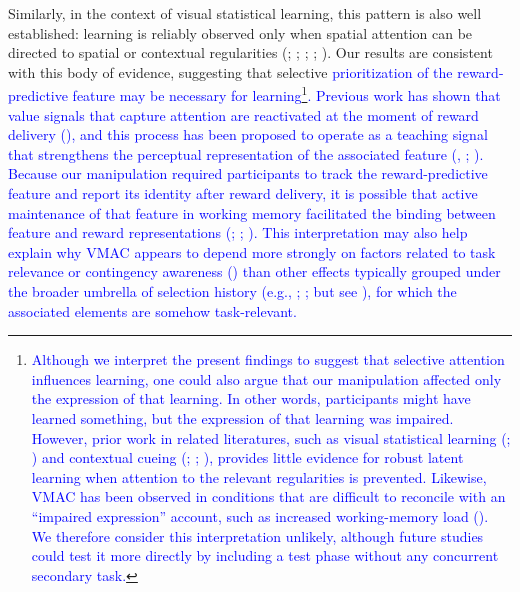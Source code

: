 \documentclass[
  man,
  floatsintext,
  longtable,
  nolmodern,
  notxfonts,
  notimes,
  mask,
  colorlinks=true,linkcolor=blue,citecolor=blue,urlcolor=blue]{apa7}
\begin{document}
Similarly, in the context of visual statistical learning, this pattern
is also well established: learning is reliably observed only when
spatial attention can be directed to spatial or contextual regularities
(;
;
;
;
). Our results are
consistent with this body of evidence, suggesting that selective
\textcolor{blue}{prioritization of the reward-predictive feature may be
necessary for learning\footnote{\textcolor{blue}{Although we interpret
  the present findings to suggest that selective attention influences
  learning, one could also argue that our manipulation affected only the
  expression of that learning. In other words, participants might have
  learned something, but the expression of that learning was impaired.
  However, prior work in related literatures, such as visual statistical
  learning (;
  ) and contextual cueing
  (;
  ;
  ), provides little
  evidence for robust latent learning when attention to the relevant
  regularities is prevented. Likewise, VMAC has been observed in
  conditions that are difficult to reconcile with an ``impaired
  expression'' account, such as increased working-memory load
  (). We
  therefore consider this interpretation unlikely, although future
  studies could test it more directly by including a test phase without
  any concurrent secondary task.}}. Previous work has shown that value
signals that capture attention are reactivated at the moment of reward
delivery (),
and this process has been proposed to operate as a teaching signal that
strengthens the perceptual representation of the associated feature
(,
; ). Because our manipulation required participants to track
the reward-predictive feature and report its identity after reward
delivery, it is possible that active maintenance of that feature in
working memory facilitated the binding between feature and reward
representations (;
;
). This interpretation may
also help explain why VMAC appears to depend more strongly on factors
related to task relevance or contingency awareness
()
than other effects typically grouped under the broader umbrella of
selection history (e.g., ; ; but see
),
for which the associated elements are somehow task-relevant.}
\end{document}
